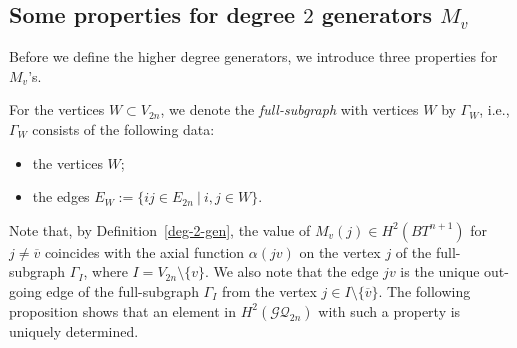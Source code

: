 \documentclass[12pt]{amsart}
\theoremstyle{remark}
\numberwithin{equation}{section}
\begin{document}
\subsection{Some properties for degree $2$ generators $M_{v}$}
\label{sect:3.2}
Before we define the higher degree generators, we introduce three properties for $M_{v}$'s.

For the vertices $W\subset V_{2n}$, we denote the {\it full-subgraph} with vertices $W$ by 
$\Gamma_{W}$, i.e., $\Gamma_{W}$ consists of the following data:
\begin{itemize}
\item the vertices $W$;
\item the edges $E_{W}:=\{ij\in E_{2n}\ |\ i,j\in W\}$.
\end{itemize}

Note that, by Definition~\ref{deg-2-gen}, 
the value of $M_{v}(j)\in H^{2}(BT^{n+1})$ for $j\not=\overline{v}$ coincides with the axial function $\alpha(jv)$ on the vertex $j$ of the full-subgraph $\Gamma_{I}$, where $I=V_{2n}\setminus \{v\}$. 
We also note that the edge $jv$ is the unique out-going edge of the full-subgraph $\Gamma_{I}$ from the vertex $j\in I\setminus\{\overline{v}\}$.
The following proposition shows that 
an element in $H^{2}(\mathcal{GQ}_{2n})$ with such a property is uniquely determined.
\end{document}
